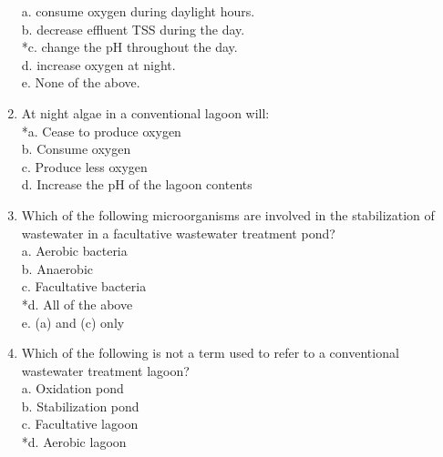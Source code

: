 \begin{enumerate}
a. consume oxygen during daylight hours. \\

b. decrease effluent TSS during the day. \\

*c. change the pH throughout the day. \\

d. increase oxygen at night. \\

e. None of the above. \\


\item  At night algae in a conventional lagoon will: \\


*a. Cease to produce oxygen \\

b. Consume oxygen \\

c. Produce less oxygen \\

d. Increase the pH of the lagoon contents \\


\item  Which of the following microorganisms are involved in the stabilization of wastewater in a facultative wastewater treatment pond? \\


a. Aerobic bacteria \\

b. Anaerobic \\

c. Facultative bacteria \\

*d. All of the above \\

e. (a) and (c) only \\


\item  Which of the following is not a term used to refer to a conventional wastewater treatment lagoon? \\


a. Oxidation pond \\

b. Stabilization pond \\

c. Facultative lagoon \\

*d. Aerobic lagoon \\



\end{enumerate}
